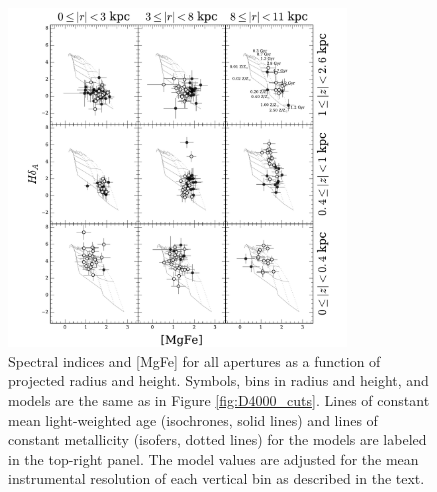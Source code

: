 \begin{figure}[t]
  \centering
  \includegraphics[width=0.8\textwidth]{891_1/figs/MgFe_multires.pdf}
  \caption[{[MgFe] vs \Hda in radius and height
    bins}]{\label{fig:MgFe_cuts}\fixspacing Spectral indices \Hda and
    [MgFe] for all apertures as a function of projected radius and
    height. Symbols, bins in radius and height, and models are the
    same as in Figure \ref{fig:D4000_cuts}. Lines of constant mean
    light-weighted age (isochrones, solid lines) and lines of constant
    metallicity (isofers, dotted lines) for the models are labeled in
    the top-right panel. The model values are adjusted for the mean
    instrumental resolution of each vertical bin as described in the
    text.}
\end{figure}

